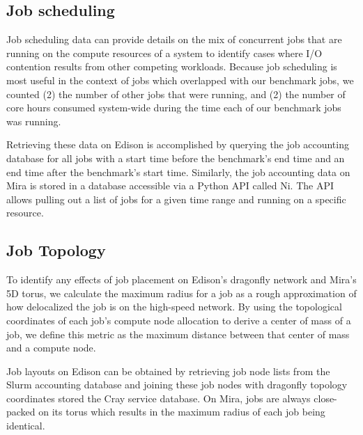 \subsection{Job scheduling} \label{sec:methods/scheduling}

Job scheduling data can provide details on the mix of concurrent jobs that are running on the compute resources of a system to identify cases where I/O contention results from other competing workloads.
Because job scheduling is most useful in the context of jobs which overlapped with our benchmark jobs, we counted (2) the number of other jobs that were running, and (2) the number of core hours consumed system-wide during the time each of our benchmark jobs was running.

Retrieving these data on Edison is accomplished by querying the job accounting database for all jobs with a start time before the benchmark's end time and an end time after the benchmark's start time.
Similarly, the job accounting data on Mira is stored in a database accessible via a Python API called Ni.
The API allows pulling out a list of jobs for a given time range and running on a specific resource.

\subsection{Job Topology} \label{sec:methods/other}

To identify any effects of job placement on Edison's dragonfly network and Mira's 5D torus, we calculate the maximum radius for a job as a rough approximation of how delocalized the job is on the high-speed network.
By using the topological coordinates of each job's compute node allocation to derive a center of mass of a job, we define this metric as the maximum distance between that center of mass and a compute node.

Job layouts on Edison can be obtained by retrieving job node lists from the Slurm accounting database and joining these job nodes with dragonfly topology coordinates stored the Cray service database.
On Mira, jobs are always close-packed on its torus which results in the maximum radius of each job being identical.
